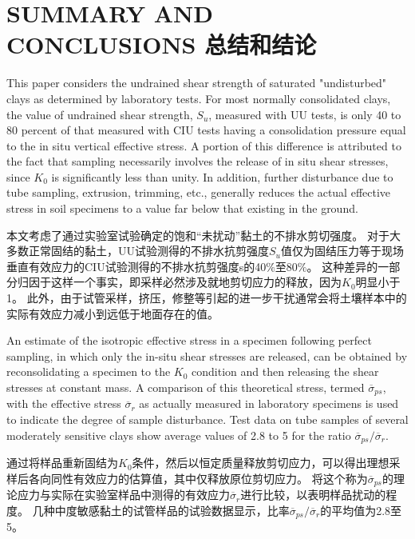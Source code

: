 \section{SUMMARY AND CONCLUSIONS 总结和结论}

\begin{paracol}{2}
    
    This paper considers the undrained shear strength of saturated "undisturbed" clays as determined by laboratory tests. For most normally consolidated clays, the value of undrained shear strength, $S_u$, measured with UU tests, is only 40 to 80 percent of that measured with CIU tests having a consolidation pressure equal to the in situ vertical effective stress. A portion of this difference is attributed to the fact that sampling necessarily involves the release of in situ shear stresses, since $K_0$ is significantly less than unity. In addition, further disturbance due to tube sampling, extrusion, trimming, etc., generally reduces the actual effective stress in soil specimens to a value far below that existing in the ground.

    \switchcolumn

    本文考虑了通过实验室试验确定的饱和“未扰动”黏土的不排水剪切强度。 对于大多数正常固结的黏土，UU试验测得的不排水抗剪强度$S_u$值仅为固结压力等于现场垂直有效应力的CIU试验测得的不排水抗剪强度s的40$\%$至80$\%$。 这种差异的一部分归因于这样一个事实，即采样必然涉及就地剪切应力的释放，因为$K_0$明显小于1。 此外，由于试管采样，挤压，修整等引起的进一步干扰通常会将土壤样本中的实际有效应力减小到远低于地面存在的值。

    \switchcolumn*

    An estimate of the isotropic effective stress in a specimen following perfect sampling, in which only the in-situ shear stresses are released, can be obtained by reconsolidating a specimen to the $K_0$ condition and then releasing the shear stresses at constant mass. A comparison of this theoretical stress, termed $\overline{\sigma}_{ps}$, with the effective stress $\overline{\sigma}_r$ as actually measured in laboratory specimens is used to indicate the degree of sample disturbance. Test data on tube samples of several moderately sensitive clays show average values of 2.8 to 5 for the ratio $\overline{\sigma}_{ps}/\overline{\sigma}_r$.

    \switchcolumn

    通过将样品重新固结为$K_0$条件，然后以恒定质量释放剪切应力，可以得出理想采样后各向同性有效应力的估算值，其中仅释放原位剪切应力。 将这个称为$\overline{\sigma}_{ps}$的理论应力与实际在实验室样品中测得的有效应力$\overline{\sigma}_r$进行比较，以表明样品扰动的程度。 几种中度敏感黏土的试管样品的试验数据显示，比率$\overline{\sigma}_{ps}/\overline{\sigma}_r$的平均值为2.8至5。


\end{paracol}
